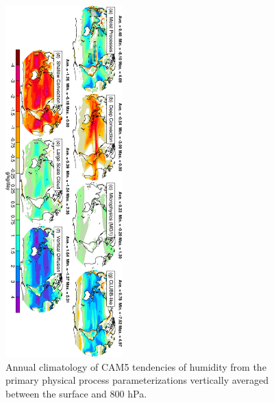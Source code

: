 \clearpage
\begin{figure}[t]
  \begin{center}
    \includegraphics[width=0.4\textwidth,angle=90.]{./figs/f_DQDT_PBL_2D_CAM5_ANN.pdf}
  \end{center}
  \caption{Annual climatology of CAM5 tendencies of humidity from the primary physical process parameterizations vertically averaged between the surface and 800 hPa.} 
\label{f_DQDT_PBL_2D_CAM5_ANN}
\end{figure} 



